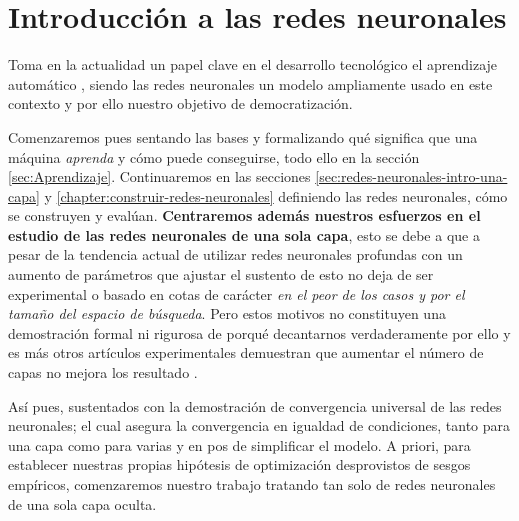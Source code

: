 
\chapter{Introducción a las redes neuronales} 
\label{chapter:Introduction-neuronal-networks}
Toma en la actualidad un papel clave en el desarrollo tecnológico el aprendizaje automático
\cite{importancia-arte-aprendizaje-automatico}, siendo 
las redes neuronales un modelo ampliamente usado en este contexto y por ello 
nuestro objetivo de democratización. 

Comenzaremos pues  sentando las bases y 
formalizando  
qué significa 
que una máquina \textit{aprenda}  y cómo puede conseguirse, 
todo ello en la sección \ref{sec:Aprendizaje}.
Continuaremos en las secciones \ref{sec:redes-neuronales-intro-una-capa} 
y \ref{chapter:construir-redes-neuronales}
definiendo las redes neuronales, cómo se construyen y evalúan. 
\label{motivo-una-capa}
\textbf{Centraremos además nuestros esfuerzos en el estudio de las redes neuronales de una sola capa}, 
esto se debe a que a pesar de la tendencia actual de utilizar redes neuronales profundas con 
un aumento de parámetros que ajustar 
\cite{a-universal-law-of-Robustness} \cite{CHAI2021100134} el sustento de esto no deja de ser experimental 
o basado en cotas de carácter \textit{en el peor de los casos y por el tamaño del espacio de búsqueda}.
Pero estos motivos no constituyen una demostración formal ni rigurosa de porqué decantarnos verdaderamente por 
ello y es más otros artículos experimentales demuestran que aumentar el número de capas no mejora los resultado 
\cite{DBLP:conf/iwann/Linan-Villafranca21}. 

Así pues, sustentados con la demostración de convergencia universal \cite{HORNIK1989359}
de las redes neuronales; el cual  asegura la convergencia en igualdad de condiciones, 
tanto para una capa como para varias
y en pos de simplificar el modelo. 
A priori, 
para establecer nuestras propias hipótesis de optimización desprovistos
de sesgos empíricos, comenzaremos nuestro trabajo tratando tan solo de redes neuronales de una sola capa oculta.